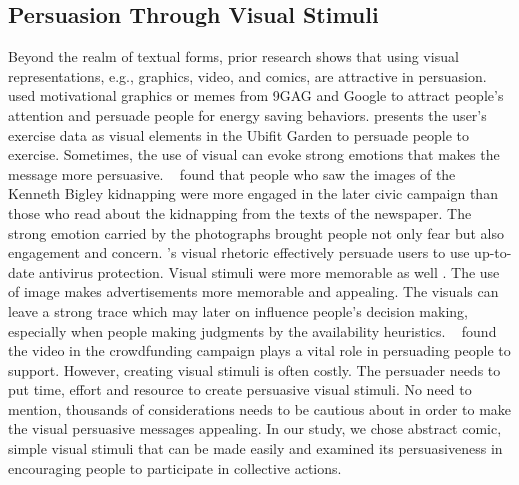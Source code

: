 \subsection{Persuasion Through Visual Stimuli}
Beyond the realm of textual forms, prior research shows that using visual representations, e.g., graphics, video, and comics, are attractive in persuasion. ~\textcite{selker2015sweetbuildinggreeter} used motivational graphics or memes from 9GAG and Google to attract people's attention and persuade people for energy saving behaviors. \textcite{consolvo2008activity} presents the user's exercise data as visual elements in the Ubifit Garden to persuade people to exercise. Sometimes, the use of visual can evoke strong emotions that makes the message more persuasive. ~\textcite{iyer2006picture} found that people who saw the images of the Kenneth Bigley kidnapping were more engaged in the later civic campaign than those who read about the kidnapping from the texts of the newspaper. The strong emotion carried by the photographs brought people not only fear but also engagement and concern. \textcite{zhang2014stop}'s visual rhetoric effectively persuade users to use up-to-date antivirus protection. Visual stimuli were more memorable as well \cite{nisbett1980human}. The use of image makes advertisements more memorable and appealing. The visuals can leave a strong trace which may later on influence people's decision making, especially when people making judgments by the availability heuristics. ~\textcite{dey2017art} found the video in the crowdfunding campaign plays a vital role in persuading people to support. However, creating visual stimuli is often costly. The persuader needs to put time, effort and resource to create persuasive visual stimuli. No need to mention, thousands of considerations needs to be cautious about in order to make the visual persuasive messages appealing. In our study, we chose abstract comic, simple visual stimuli that can be made easily and examined its persuasiveness in encouraging people to participate in collective actions. 




